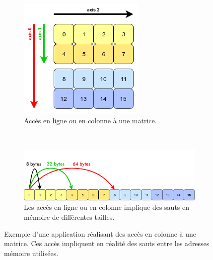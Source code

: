         \begin{figure}[h!]
            \centering
                \begin{subfigure}[b]{0.25\linewidth}
                \includegraphics[width=\linewidth]{images/dml_strides_acces_matrix.png}
                \caption{Accès en ligne ou en colonne à une matrice.}
                \label{pic:dml_strides_acces_matrix}
                \end{subfigure}
            ~ %
                \begin{subfigure}[b]{0.60\linewidth}
                \includegraphics[width=\linewidth]{images/dml_strides_acces.png}
                \caption{Les accès en ligne ou en colonne implique des sauts en mémoire de différentes tailles.}
                \label{pic:dml_strides_acces}
                \end{subfigure}
            \caption{Exemple d'une application réalisant des accès en colonne à une matrice. Ces accès impliquent en réalité des sauts entre les adresses mémoire utilisées.}\label{pic:dml_strides_acces_main}
        \end{figure}
    
